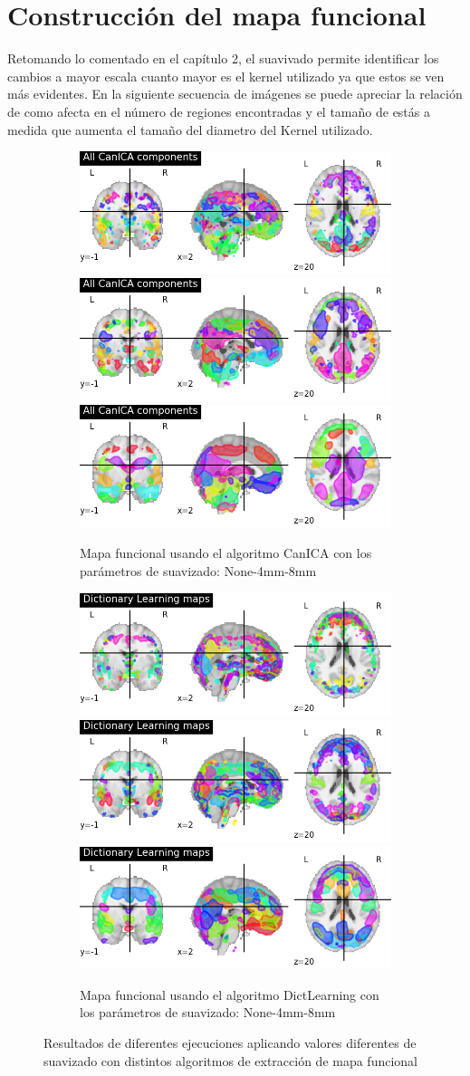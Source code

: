 \section{Construcción del mapa funcional}

Retomando lo comentado en el capítulo 2, el suavivado permite identificar los cambios a mayor escala cuanto mayor es el kernel utilizado ya que estos se ven más evidentes. En la siguiente secuencia de imágenes se puede apreciar la relación de como afecta en el número de regiones encontradas y el tamaño de estás a medida que aumenta el tamaño del diametro del Kernel utilizado.

\begin{figure}[H]
  \begin{subfigure}{\linewidth}
  \includegraphics[width=.3\linewidth]{img/canica/canica_None.png}\hfill
  \includegraphics[width=.3\linewidth]{img/canica/canica_4.png}\hfill
  \includegraphics[width=.3\linewidth]{img/canica/canica_8.png}
  \caption{Mapa funcional usando el algoritmo  CanICA con los parámetros de suavizado: None-4mm-8mm}
  \end{subfigure}\par\medskip
  \begin{subfigure}{\linewidth}
  \includegraphics[width=.3\linewidth]{img/canica/dictlearn_None}\hfill
  \includegraphics[width=.3\linewidth]{img/canica/dictlearn_4}\hfill
  \includegraphics[width=.3\linewidth]{img/canica/dictlearn_8}
  \caption{Mapa funcional usando el algoritmo  DictLearning con los parámetros de suavizado: None-4mm-8mm}
  \end{subfigure}\par\medskip
  \caption{Resultados de diferentes ejecuciones aplicando valores diferentes de suavizado con distintos algoritmos de extracción de mapa funcional}
  \label{preproc:mapa}
\end{figure}

